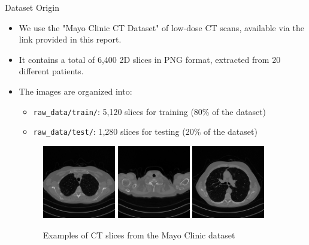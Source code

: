 

\begin{frame}{Dataset Origin}
  \begin{itemize}
    \item We use the "Mayo Clinic CT Dataset" of low-dose CT scans, available via the link provided in this report.
    \item It contains a total of 6,400 2D slices in PNG format, extracted from 20 different patients.
    \item The images are organized into:
      \begin{itemize}
        \item \texttt{raw\_data/train/}: 5,120 slices for training (80\% of the dataset)
        \item \texttt{raw\_data/test/}: 1,280 slices for testing (20\% of the dataset)
      \end{itemize}
 \begin{figure}
    \centering
    \includegraphics[width=0.3\textwidth]{media/2.png}
    \includegraphics[width=0.3\textwidth]{media/3.png}
    \includegraphics[width=0.3\textwidth]{media/100.png}
    \caption{Examples of CT slices from the Mayo Clinic dataset}
  \end{figure}  
  \end{itemize}
\end{frame}

